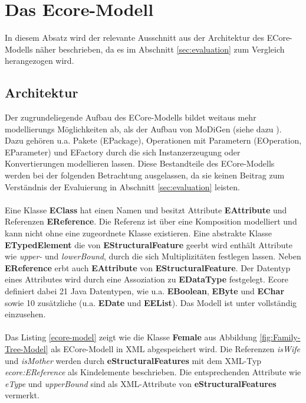 \section{Das Ecore-Modell}
In diesem Absatz wird der relevante Ausschnitt aus der Architektur des ECore-Modells n\"aher beschrieben, da es im Abschnitt \ref{sec:evaluation} zum Vergleich herangezogen wird.

\subsection{Architektur}
Der zugrundeliegende Aufbau des ECore-Modells bildet weitaus mehr modellierungs Möglichkeiten ab, als der Aufbau von MoDiGen (siehe dazu \cite{eclipse_ecore}). Dazu gehören u.a. Pakete (EPackage), Operationen mit Parametern (EOperation, EParameter) und EFactory durch die sich Instanzerzeugung oder Konvertierungen modellieren lassen. Diese Bestandteile des ECore-Modells werden bei der folgenden Betrachtung ausgelassen, da sie keinen Beitrag zum Verständnis der Evaluierung in Abschnitt \ref{sec:evaluation} leisten.\\
\\
Eine Klasse \textbf{EClass} hat einen Namen und besitzt Attribute \textbf{EAttribute} und Referenzen \textbf{EReference}. Die Referenz ist über eine Komposition modelliert und kann nicht ohne eine zugeordnete Klasse existieren. Eine abstrakte Klasse \textbf{ETypedElement} die von \textbf{EStructuralFeature} geerbt wird enth\"alt Attribute wie \textit{upper-} und \textit{lowerBound}, durch die sich Multiplizitäten festlegen lassen. Neben \textbf{EReference} erbt auch \textbf{EAttribute} von \textbf{EStructuralFeature}. Der Datentyp eines Attributes wird durch eine Assoziation zu \textbf{EDataType} festgelegt. Ecore definiert dabei 21 Java Datentypen, wie u.a. \textbf{EBoolean}, \textbf{EByte} und \textbf{EChar} sowie 10 zus\"atzliche (u.a. \textbf{EDate} und \textbf{EEList}). Das Modell ist unter \cite{eclipse_core} vollst\"andig einzusehen.\\
\\
Das Listing \ref{ecore-model} zeigt wie die Klasse \textbf{Female} aus Abbildung \ref{fig:Family-Tree-Model} als ECore-Modell in XML abgespeichert wird. Die Referenzen \textit{isWife} und \textit{isMother} werden durch \textbf{eStructuralFeatures} mit dem XML-Typ \textit{ecore:EReference} als Kindelemente beschrieben. Die entsprechenden Attribute wie \textit{eType} und \textit{upperBound} sind als XML-Attribute von \textbf{eStructuralFeatures} vermerkt.


